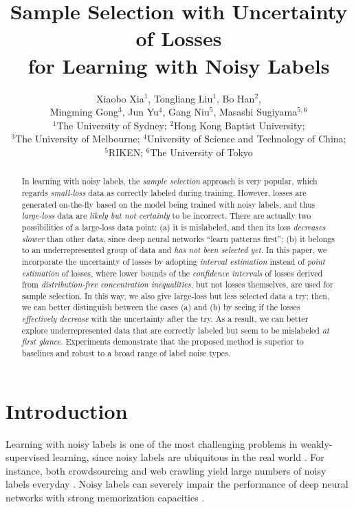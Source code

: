\documentclass[11pt]{article}
\title{Sample Selection with Uncertainty of Losses\\
    for Learning with Noisy Labels}
\author{
  Xiaobo Xia$^{1}$,
  Tongliang Liu$^{1}$,
  Bo Han$^{2}$,\\
  Mingming Gong$^3$,
  Jun Yu$^4$,
  Gang Niu$^5$,
  Masashi Sugiyama$^{5,6}$\\
  \small{$^1$The University of Sydney;}
  \small{$^2$Hong Kong Baptist University;}\\
  \small{$^3$The University of Melbourne;}
  \small{$^4$University of Science and Technology of China;}\\
  \small{$^5$RIKEN;}
  \small{$^6$The University of Tokyo}
}
\date{}
\begin{document}
\maketitle

\begin{abstract}
In learning with noisy labels, the \emph{sample selection} approach is very popular, which regards \emph{small-loss} data as correctly labeled during training. However, losses are generated on-the-fly based on the model being trained with noisy labels, and thus \emph{large-loss} data are \emph{likely but not certainly} to be incorrect. There are actually two possibilities of a large-loss data point: (a) it is mislabeled, and then its loss \emph{decreases slower} than other data, since deep neural networks ``learn patterns first''; (b) it belongs to an underrepresented group of data and \emph{has not been selected yet}.
In this paper, we incorporate the uncertainty of losses by adopting \emph{interval estimation} instead of \emph{point estimation} of losses, where lower bounds of the \emph{confidence intervals} of losses derived from \emph{distribution-free concentration inequalities}, but not losses themselves, are used for sample selection. In this way, we also give large-loss but less selected data a try; then, we can better distinguish between the cases (a) and (b) by seeing if the losses \emph{effectively decrease} with the uncertainty after the try. As a result, we can better explore underrepresented data that are correctly labeled but seem to be mislabeled \emph{at first glance}. Experiments demonstrate that the proposed method is superior to baselines and robust to a broad range of label noise types.

\end{abstract}

\newpage


\section{Introduction}
Learning with noisy labels is one of the most challenging problems in weakly-supervised learning, since noisy labels are ubiquitous in the real world \citep{mirzasoleiman2020coresets,yu2019does,nishi2021augmentation,arazo2019unsupervised,yang2021free}. For instance, both crowdsourcing and web crawling yield large numbers of noisy labels everyday \citep{han2018co}. Noisy labels can severely impair the performance of deep neural networks with strong memorization capacities \citep{zhang2017understanding,zhang2018generalized,pleiss2020identifying,lukasik2020does}. 
\end{document}
